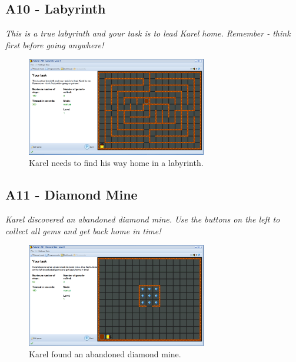 \documentclass[article,A4,12pt]{llncs}
\begin{document}
\subsection{A10 - Labyrinth}

{\em This is a true labyrinth and your task is to lead Karel 
home. Remember - think first before going anywhere!}

\begin{figure}[!ht]
\begin{center}
\includegraphics[width=0.7\textwidth]{img/a10.png}
\end{center}
\vspace{-4mm}
\caption{Karel needs to find his way home in a labyrinth.}
\label{fig:a10}
\vspace{-4mm}
\end{figure}
\noindent


\subsection{A11 - Diamond Mine}

{\em Karel discovered an abandoned diamond mine. Use the buttons
on the left to collect all gems and get back home in time!}

\begin{figure}[!ht]
\begin{center}
\includegraphics[width=0.7\textwidth]{img/a11.png}
\end{center}
\vspace{-4mm}
\caption{Karel found an abandoned diamond mine.}
\label{fig:a11}
\vspace{-4mm}
\end{figure}
\noindent
\newpage
\end{document}

